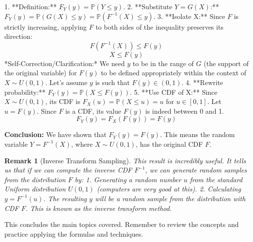 \documentclass[11pt]{article}
\theoremstyle{mytheoremstyle}
\theoremstyle{mydefinitionstyle}
\newtheorem{remark}[theorem]{Remark}
\newcommand{\Prob}{\mathbb{P}} %
\begin{document}
1.  **Definition:** $F_Y(y) = \Prob(Y \le y)$.
2.  **Substitute $Y=G(X)$:** $F_Y(y) = \Prob(G(X) \le y) = \Prob(F^{-1}(X) \le y)$.
3.  **Isolate X:** Since $F$ is strictly increasing, applying $F$ to both sides of the inequality preserves its direction:
    \[ F(F^{-1}(X)) \le F(y) \]
    \[ X \le F(y) \]
    *Self-Correction/Clarification:* We need $y$ to be in the range of $G$ (the support of the original variable) for $F(y)$ to be defined appropriately within the context of $X \sim U(0,1)$. Let's assume $y$ is such that $F(y) \in (0, 1)$.
4.  **Rewrite probability:** $F_Y(y) = \Prob(X \le F(y))$.
5.  **Use CDF of X:** Since $X \sim U(0, 1)$, its CDF is $F_X(u) = \Prob(X \le u) = u$ for $u \in [0, 1]$. Let $u = F(y)$. Since $F$ is a CDF, its value $F(y)$ is indeed between 0 and 1.
    \[ F_Y(y) = F_X(F(y)) = F(y) \]

\textbf{Conclusion:} We have shown that $F_Y(y) = F(y)$. This means the random variable $Y = F^{-1}(X)$, where $X \sim U(0, 1)$, has the original CDF $F$.

\begin{remark}[Inverse Transform Sampling]
This result is incredibly useful. It tells us that if we can compute the inverse CDF $F^{-1}$, we can generate random samples from the distribution $F$ by:
1. Generating a random number $u$ from the standard Uniform distribution $U(0, 1)$ (computers are very good at this).
2. Calculating $y = F^{-1}(u)$. The resulting $y$ will be a random sample from the distribution with CDF $F$.
This is known as the inverse transform method.
\end{remark}

This concludes the main topics covered. Remember to review the concepts and practice applying the formulas and techniques.
\end{document}
